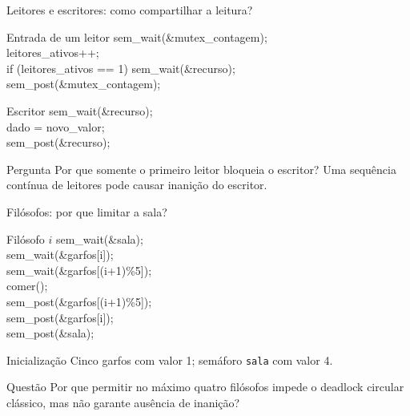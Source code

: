 \documentclass[aspectratio=169,11pt]{beamer}
\begin{document}
\begin{frame}[fragile]{Leitores e escritores: como compartilhar a leitura?}
\small
\begin{block}{Entrada de um leitor}
\ttfamily\footnotesize
sem\_wait(\&mutex\_contagem);\\
leitores\_ativos++;\\
if (leitores\_ativos == 1) sem\_wait(\&recurso);\\
sem\_post(\&mutex\_contagem);
\end{block}
\begin{block}{Escritor}
\ttfamily\footnotesize
sem\_wait(\&recurso);\\
dado = novo\_valor;\\
sem\_post(\&recurso);
\end{block}
\begin{alertblock}{Pergunta}
Por que somente o primeiro leitor bloqueia o escritor? Uma sequência contínua de leitores pode causar inanição do escritor.
\end{alertblock}
\end{frame}

\begin{frame}[fragile]{Filósofos: por que limitar a sala?}
\small
\begin{block}{Filósofo $i$}
\ttfamily\footnotesize
sem\_wait(\&sala);\\
sem\_wait(\&garfos[i]);\\
sem\_wait(\&garfos[(i+1)\%5]);\\
comer();\\
sem\_post(\&garfos[(i+1)\%5]);\\
sem\_post(\&garfos[i]);\\
sem\_post(\&sala);
\end{block}
\begin{block}{Inicialização}
Cinco garfos com valor 1; semáforo \texttt{sala} com valor 4.
\end{block}
\begin{alertblock}{Questão}
Por que permitir no máximo quatro filósofos impede o deadlock circular clássico, mas não garante ausência de inanição?
\end{alertblock}
\end{frame}
\end{document}
